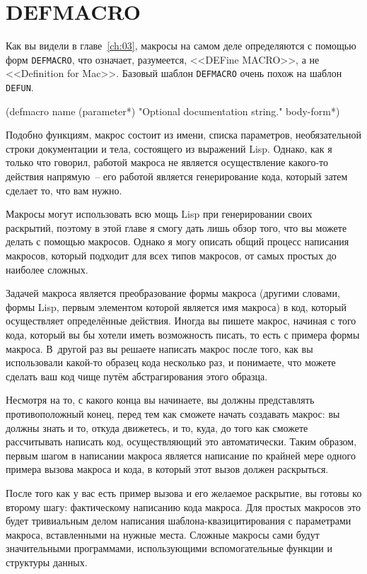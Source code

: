 \section{DEFMACRO}

Как вы видели в главе~\ref{ch:03}, макросы на самом деле определяются с помощью форм
\lstinline{DEFMACRO}, что означает, разумеется, <<DEFine MACRO>>, а не <<Definition for
Mac>>. Базовый шаблон \lstinline{DEFMACRO} очень похож на шаблон \lstinline{DEFUN}.

\begin{myverb}
(defmacro name (parameter*)
  "Optional documentation string."
  body-form*)
\end{myverb}

Подобно функциям, макрос состоит из имени, списка параметров, необязательной строки
документации и тела, состоящего из выражений Lisp. Однако, как я
только что говорил, работой макроса не является осуществление какого-то действия
напрямую~-- его работой является генерирование кода, который затем сделает то, что вам
нужно.

Макросы могут использовать всю мощь Lisp при генерировании своих раскрытий, поэтому в этой
главе я смогу дать лишь обзор того, что вы можете делать с по\-мощью макросов. Однако я могу
описать общий процесс написания макросов, который подходит для всех типов макросов, от
самых простых до наиболее сложных.

Задачей макроса является преобразование формы макроса (другими словами, формы Lisp, первым
элементом которой является имя макроса) в код, который осуществляет определённые
действия. Иногда вы пишете макрос, начиная с того кода, который вы бы хотели иметь
возможность писать, то есть с примера формы макроса. В~другой раз вы решаете написать
макрос после того, как вы использовали какой-то образец кода несколько раз, и понимаете,
что можете сделать ваш код чище путём абстрагирования этого образца.

Несмотря на то, с какого конца вы начинаете, вы должны представлять противоположный конец,
перед тем как сможете начать создавать макрос: вы должны знать и то, откуда движетесь, и
то, куда, до того как сможете рассчитывать написать код, осуществляющий это
автоматически. Таким образом, первым шагом в написании макроса является написание по
крайней мере одного примера вызова макроса и кода, в который этот вызов должен
раскрыться.

После того как у вас есть пример вызова и его желаемое раскрытие, вы готовы ко второму
шагу: фактическому написанию кода макроса. Для простых макросов это будет тривиальным
делом написания шаблона-квазицитирования с параметрами макроса, вставленными на нужные
места. Сложные макросы сами будут значительными программами, использующими вспомогательные
функции и структуры данных.

